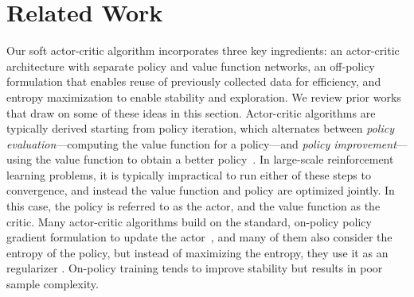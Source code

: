 \documentclass{article}
\begin{document}
\section{Related Work}

Our soft actor-critic algorithm incorporates three key ingredients: an actor-critic architecture with separate policy and value function networks, an off-policy formulation that enables reuse of previously collected data for efficiency, and entropy maximization to enable stability and exploration. We review prior works that draw on some of these ideas in this section. Actor-critic algorithms are typically derived starting from policy iteration, which alternates between \emph{policy evaluation}---computing the value function for a policy---and \emph{policy improvement}---using the value function to obtain a better policy~\citep{barto1983neuronlike,sutton1998reinforcement}. In large-scale reinforcement learning problems, it is typically impractical to run either of these steps to convergence, and instead the value function and policy are optimized jointly. In this case, the policy is referred to as the actor, and the value function as the critic. Many actor-critic algorithms build on the standard, on-policy policy gradient formulation to update the actor~\citep{peters2008reinforcement}, and many of them also consider the entropy of the policy, but instead of maximizing the entropy, they use it as an regularizer \citep{schulman2017proximal,schulman2015trust,mnih2016asynchronous,gruslys2017reactor}. On-policy training tends to improve stability but results in poor sample complexity.
\end{document}
